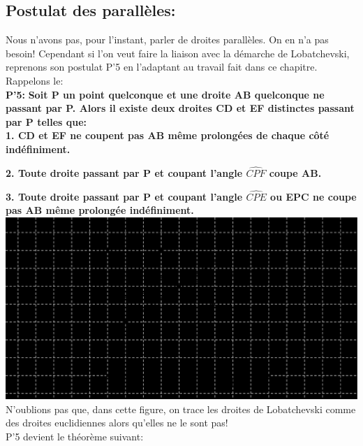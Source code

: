 \documentclass[a4paper, 12pt, twoside]{book}
\begin{document}
\subsection{Postulat des parallèles:}





Nous n'avons pas, pour l'instant, parler de droites parallèles. On en n'a pas besoin! Cependant si l'on veut faire la liaison avec la démarche de Lobatchevski, reprenons  son postulat P'5 en l'adaptant au travail fait dans ce chapitre. Rappelons le:\\
 
  \textbf{P'5:} \textbf{Soit P un point quelconque et une droite AB quelconque ne passant par P. Alors il existe deux droites CD et EF distinctes passant par P telles que:}\\
  
  
  
 \textbf{1. CD et EF ne coupent pas AB même prolongées de chaque côté indéfiniment.}\
  
  \textbf{2. Toute droite passant par P et coupant l'angle $\hat{CPF}$ coupe AB.}\
  
 \textbf{3. Toute droite passant par P et coupant l'angle $\hat{CPE}$ ou EPC ne coupe pas AB même prolongée indéfiniment.}\\
 
 \includegraphics[scale=0.4]{figures/lob2.eps}\\ 
 
 N'oublions pas que, dans cette figure, on trace les droites de Lobatchevski comme des droites euclidiennes alors qu'elles ne le sont pas!\\
 
 
 
  
     
 P'5 devient le théorème suivant:\
 
\end{document}
